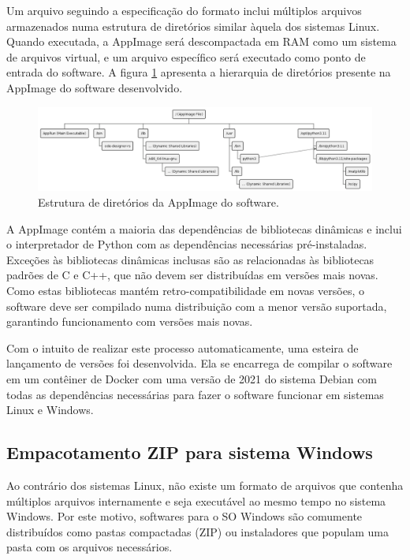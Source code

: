 \documentclass[
	12pt,				%
	openright,			%
	oneside,			%
	a4paper,			%
	main=brazil,
	english,			%
	]{ufsj-abntex2}
\begin{document}
Um arquivo seguindo a especificação do formato inclui múltiplos arquivos armazenados numa estrutura de diretórios similar àquela dos sistemas Linux. Quando executada, a AppImage será descompactada em RAM como um sistema de arquivos virtual, e um arquivo específico será executado como ponto de entrada do software. A figura \ref{fig:appimage} apresenta a hierarquia de diretórios presente na AppImage do software desenvolvido.

\begin{figure}[h]
    \centering
    \includegraphics[scale=0.37]{diagrams/img/appimage.png} 
    \caption{Estrutura de diretórios da AppImage do software.}
    \label{fig:appimage}
\end{figure}

A AppImage contém a maioria das dependências de bibliotecas dinâmicas e inclui o interpretador de Python com as dependências necessárias pré-instaladas. Exceções às bibliotecas dinâmicas inclusas são as relacionadas às bibliotecas padrões de C e C++, que não devem ser 
distribuídas em versões mais novas. Como estas bibliotecas mantém retro-compatibilidade em novas versões, o software deve ser compilado numa distribuição com a menor versão suportada, garantindo funcionamento com versões mais novas.

Com o intuito de realizar este processo automaticamente, uma esteira de lançamento de versões foi desenvolvida. Ela se encarrega de compilar o software em um contêiner de Docker \cite{merkel2014docker} com uma versão de 2021 do sistema Debian com todas as dependências necessárias para fazer o software funcionar em sistemas Linux e Windows. 

\subsection{Empacotamento ZIP para sistema Windows}

Ao contrário dos sistemas Linux, não existe um formato de arquivos que contenha múltiplos arquivos internamente e seja executável ao mesmo tempo no sistema Windows. Por este motivo, softwares para o SO Windows são comumente distribuídos como pastas compactadas (ZIP) ou instaladores que populam uma pasta com os arquivos necessários.
\end{document}
